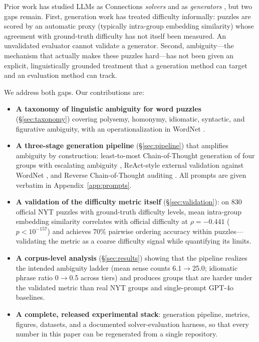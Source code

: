 \documentclass[11pt]{article}
\begin{document}
Prior work has studied LLMs as Connections \emph{solvers} \citep{samadarshi2024connecting, todd2024missed} and as \emph{generators} \citep{merino2024making}, but two gaps remain. First, generation work has treated difficulty informally: puzzles are scored by an automatic proxy (typically intra-group embedding similarity) whose agreement with ground-truth difficulty has not itself been measured. An unvalidated evaluator cannot validate a generator. Second, ambiguity---the mechanism that actually makes these puzzles hard---has not been given an explicit, linguistically grounded treatment that a generation method can target and an evaluation method can track.

We address both gaps. Our contributions are:

\begin{itemize}[leftmargin=*, itemsep=1pt, topsep=2pt]
    \item \textbf{A taxonomy of linguistic ambiguity for word puzzles} (\S\ref{sec:taxonomy}) covering polysemy, homonymy, idiomatic, syntactic, and figurative ambiguity, with an operationalization in WordNet \citep{miller1995wordnet}.
    \item \textbf{A three-stage generation pipeline} (\S\ref{sec:pipeline}) that amplifies ambiguity by construction: least-to-most Chain-of-Thought generation of four groups with escalating ambiguity \citep{zhou2023least, wei2022chain}, ReAct-style external validation against WordNet \citep{yao2023react}, and Reverse Chain-of-Thought auditing \citep{xue2023rcot}. All prompts are given verbatim in Appendix~\ref{app:prompts}.
    \item \textbf{A validation of the difficulty metric itself} (\S\ref{sec:validation}): on 830 official NYT puzzles with ground-truth difficulty levels, mean intra-group embedding similarity correlates with official difficulty at $\rho=-0.441$ ($p<10^{-157}$) and achieves 70\% pairwise ordering accuracy within puzzles---validating the metric as a coarse difficulty signal while quantifying its limits.
    \item \textbf{A corpus-level analysis} (\S\ref{sec:results}) showing that the pipeline realizes the intended ambiguity ladder (mean sense counts 6.1$\rightarrow$25.0; idiomatic phrase ratio 0$\rightarrow$0.5 across tiers) and produces groups that are harder under the validated metric than real NYT groups and single-prompt GPT-4o baselines.
    \item \textbf{A complete, released experimental stack}: generation pipeline, metrics, figures, datasets, and a documented solver-evaluation harness, so that every number in this paper can be regenerated from a single repository.
\end{itemize}
\end{document}
